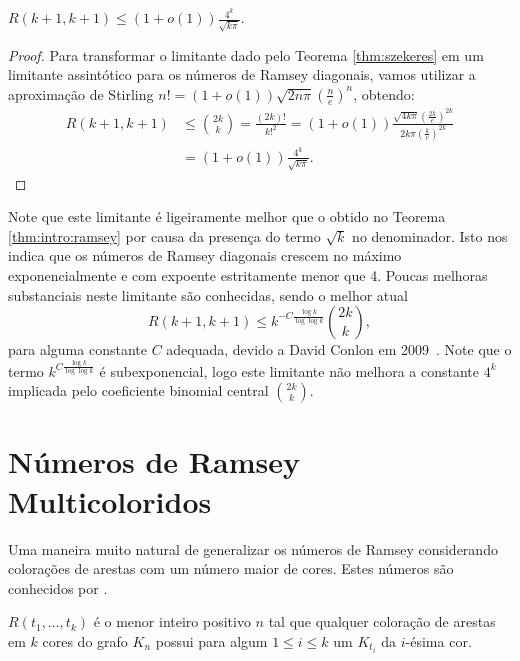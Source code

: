 \begin{corollary}
\label{col:szekeres}
$\displaystyle R(k+1,k+1) \leq (1+o(1))\frac{4^k}{\sqrt{k \pi}}$.
\end{corollary}
\begin{proof}
Para transformar o limitante dado pelo Teorema \ref{thm:szekeres} em um limitante assintótico para os números de Ramsey diagonais, vamos utilizar a aproximação de Stirling $n! = (1+o(1)) \sqrt{2n \pi} \left ( \frac{n}{e} \right)^n $,  obtendo:
\begin{align*}
R(k+1,k+1) &\leq \binom{2k}{k} = \frac{(2k)!}{k!^2} = (1 +o(1)) \frac{\sqrt{4 k \pi} \left ( \frac{2k}{e} \right)^{2k} }{2k\pi \left ( \frac{k}{e} \right)^{2k} } \\
&= (1 +o(1))\frac{4^k}{\sqrt{k\pi}}.
\end{align*}
\end{proof}

Note que este limitante é ligeiramente melhor que o obtido no Teorema \ref{thm:intro:ramsey} por causa da presença do termo $\sqrt{k}$ no denominador. Isto nos indica que os números de Ramsey diagonais crescem no máximo exponencialmente e com expoente estritamente menor que 4. Poucas melhoras substanciais neste limitante são conhecidas, sendo o melhor atual
\[R(k+1,k+1) \leq k^{-C\frac{\log k}{\log \log k}} \binom{2k}{k},\]
para alguma constante $C$ adequada, devido a David Conlon em 2009~\cite{conlon}. Note que o termo $k^{C\frac{\log k}{\log \log k}}$ é subexponencial, logo este limitante não melhora a constante $4^k$ implicada pelo coeficiente binomial central $\binom{2k}{k}$.


\section{Números de Ramsey Multicoloridos}

Uma maneira muito natural de generalizar os números de Ramsey considerando colorações de arestas com um número maior de cores. Estes números são conhecidos por .

\begin{definition}
$R(t_1, \dots, t_k)$ é o menor inteiro positivo $n$ tal que qualquer coloração de arestas em $k$ cores do grafo $K_n$ possui para algum $1 \leq i \leq k$ um $K_{t_i}$ da $i$-ésima cor.
\end{definition}

